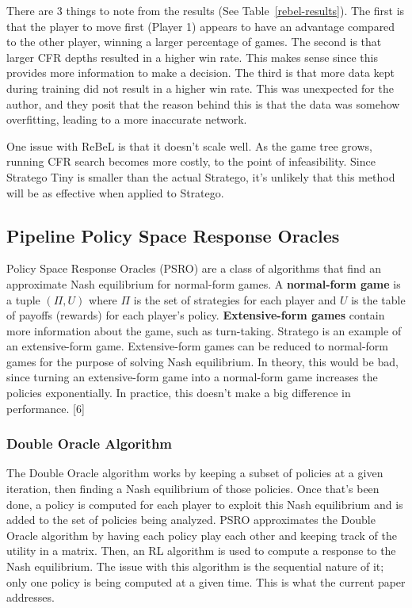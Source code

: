 \documentclass{article}
\begin{document}
There are 3 things to note from the results (See Table~\ref{rebel-results}). 
The first is that the player to move first (Player 1) appears to have an advantage compared to the other player, winning a larger percentage of games. 
The second is that larger CFR depths resulted in a higher win rate. This makes sense since this provides more information to make a decision. 
The third is that more data kept during training did not result in a higher win rate. 
This was unexpected for the author, and they posit that the reason behind this is that the data was somehow overfitting, leading to a more inaccurate network. 

One issue with ReBeL is that it doesn’t scale well. As the game tree grows, running CFR search becomes more costly, to the point of infeasibility. 
Since Stratego Tiny is smaller than the actual Stratego, it’s unlikely that this method will be as effective when applied to Stratego. 

\subsection{Pipeline Policy Space Response Oracles}

Policy Space Response Oracles (PSRO) are a class of algorithms that find an approximate Nash equilibrium for normal-form games. 
A \textbf{normal-form game} is a tuple $(\Pi, U)$ where $\Pi$ is the set of strategies for each player and $U$ is the table of payoffs (rewards) for each player’s policy. 
\textbf{Extensive-form games} contain more information about the game, such as turn-taking. Stratego is an example of an extensive-form game. 
Extensive-form games can be reduced to normal-form games for the purpose of solving Nash equilibrium. 
In theory, this would be bad, since turning an extensive-form game into a normal-form game increases the policies exponentially. In practice, this doesn’t make a big difference in performance. [6]

\subsubsection{Double Oracle Algorithm}

The Double Oracle algorithm works by keeping a subset of policies at a given iteration, then finding a Nash equilibrium of those policies. 
Once that’s been done, a policy is computed for each player to exploit this Nash equilibrium and is added to the set of policies being analyzed. 
PSRO approximates the Double Oracle algorithm by having each policy play each other and keeping track of the utility in a matrix. 
Then, an RL algorithm is used to compute a response to the Nash equilibrium. The issue with this algorithm is the sequential nature of it; only one policy is being computed at a given time. 
This is what the current paper addresses. 
\end{document}
